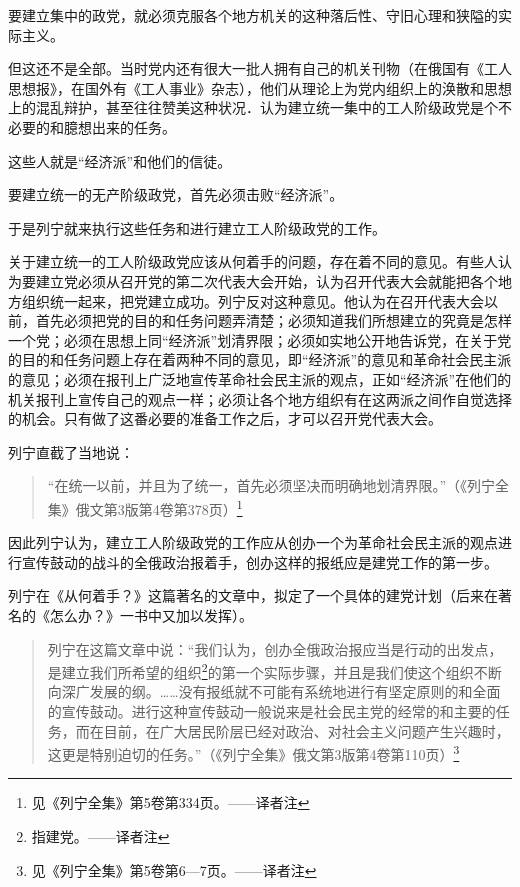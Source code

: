 要建立集中的政党，就必须克服各个地方机关的这种落后性、守旧心理和狭隘的实际主义。

但这还不是全部。当时党内还有很大一批人拥有自己的机关刊物（在俄国有《工人思想报》，在国外有《工人事业》杂志），他们从理论上为党内组织上的涣散和思想上的混乱辩护，甚至往往赞美这种状况．认为建立统一集中的工人阶级政党是个不必要的和臆想出来的任务。

这些人就是“经济派”和他们的信徒。

要建立统一的无产阶级政党，首先必须击败“经济派”。

于是列宁就来执行这些任务和进行建立工人阶级政党的工作。

关于建立统一的工人阶级政党应该从何着手的问题，存在着不同的意见。有些人认为要建立党必须从召开党的第二次代表大会开始，认为召开代表大会就能把各个地方组织统一起来，把党建立成功。列宁反对这种意见。他认为在召开代表大会以前，首先必须把党的目的和任务问题弄清楚；必须知道我们所想建立的究竟是怎样一个党；必须在思想上同“经济派”划清界限；必须如实地公开地告诉党，在关于党的目的和任务问题上存在着两种不同的意见，即“经济派”的意见和革命社会民主派的意见；必须在报刊上广泛地宣传革命社会民主派的观点，正如“经济派”在他们的机关报刊上宣传自己的观点一样；必须让各个地方组织有在这两派之间作自觉选择的机会。只有做了这番必要的准备工作之后，才可以召开党代表大会。

列宁直截了当地说：

\begin{quotation}
“在统一以前，并且为了统一，首先必须坚决而明确地划清界限。”（《列宁全集》俄文第3版第4卷第378页）\footnote{见《列宁全集》第5卷第334页。——译者注}
\end{quotation}

因此列宁认为，建立工人阶级政党的工作应从创办一个为革命社会民主派的观点进行宣传鼓动的战斗的全俄政治报着手，创办这样的报纸应是建党工作的第一步。

列宁在《从何着手？》这篇著名的文章中，拟定了一个具体的建党计划（后来在著名的《怎么办？》一书中又加以发挥）。

\begin{quotation}
列宁在这篇文章中说：“我们认为，创办全俄政治报应当是行动的出发点，是建立我们所希望的组织\footnote{指建党。——译者注}的第一个实际步骤，并且是我们使这个组织不断向深广发展的纲。……没有报纸就不可能有系统地进行有坚定原则的和全面的宣传鼓动。进行这种宣传鼓动一般说来是社会民主党的经常的和主要的任务，而在目前，在广大居民阶层已经对政治、对社会主义问题产生兴趣时，这更是特别迫切的任务。”（《列宁全集》俄文第3版第4卷第110页）\footnote{见《列宁全集》第5卷第6—7页。——译者注}
\end{quotation}

